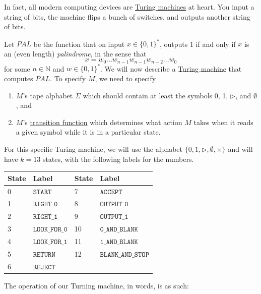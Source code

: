  In fact, all modern computing devices are \hyperref[def:turing-machine]{Turing machines} at heart. You input a string of bits, the machine flips a bunch of switches, and outputs another string of bits. 

  \begin{example}
    \label{ex:turning-machine-for-palindromes}
    Let $PAL$ be the function that on input $x \in \{0,1\}^*$, outputs 1 if and only if $x$ is an (even length) \textit{palindrome}, in the sense that
    \begin{equation}
      x = w_0 ... w_{n-1} w_{n-1} w_{n-2} ... w_0
    \end{equation}
    for some $n \in \mathbb{N}$ and $w \in \{0,1\}^*$. We will now describe a \hyperref[def:turing-machine]{Turing machine} that computes $PAL$. To specify $M$, we need to specify
    \begin{enumerate}
        \item $M$'s tape alphabet $\Sigma$ which should contain at least the symbols 0, 1, $\triangleright$, and $\emptyset$, and
        \item $M$'s \hyperref[sm-def:transition-function]{transition function} which determines what action $M$ takes when it reads a given symbol while it is in a particular state. 
    \end{enumerate}
    For this specific Turing machine, we will use the alphabet $\{0,1,\triangleright, \emptyset, \times\}$ and will have $k=13$ states, with the following labels for the numbers. 
    \begin{center}
    \begin{tabular}{l|l|l|l}
        State & Label & State & Label\\
        \hline
        0 & $\texttt{START}$ & 7&$\texttt{ACCEPT}$\\
        1& $\texttt{RIGHT\_0}$ & 8&$\texttt{OUTPUT\_0}$\\
        2&$\texttt{RIGHT\_1}$ & 9&$\texttt{OUTPUT\_1}$ \\
        3&$\texttt{LOOK\_FOR\_0}$ & 10&$\texttt{0\_AND\_BLANK}$\\
        4&$\texttt{LOOK\_FOR\_1}$ & 11&$\texttt{1\_AND\_BLANK}$\\
        5&$\texttt{RETURN}$ & 12&$\texttt{BLANK\_AND\_STOP}$\\
        6&$\texttt{REJECT}$ & & \\
    \end{tabular}
    \end{center}
    The operation of our Turning machine, in words, is as such: 

\end{example}
